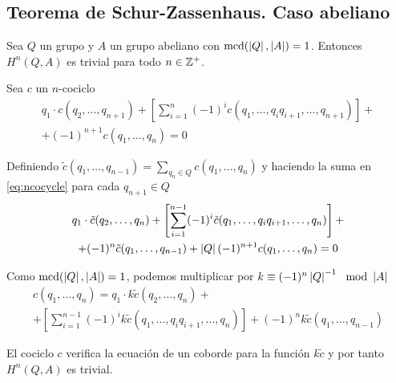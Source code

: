 \subsection{Teorema de Schur-Zassenhaus. Caso abeliano}

\begin{lema}\label{lem:trivh2}%
	Sea $Q$ un grupo y $A$ un grupo abeliano con $\operatorname{mcd}(\left|Q\right|, \left|A\right|) = 1$. Entonces $H^n(Q,A)$ es trivial para todo $n\in\mathbb{Z}^+$.
	\begin{demostracion}
		Sea $c$ un $n$-cociclo
		\begin{multline}\label{eq:ncocycle}
			q_1\cdot c(q_2,\hdots,q_{n+1}) + \left[\sum\limits_{i=1}^{n} (-1)^i c(q_1,\hdots,q_iq_{i+1},\hdots,q_{n+1}) \right] + \\ + (-1)^{n+1}c(q_1,\hdots,q_n) = 0
		\end{multline}
		
		Definiendo $\tilde c(q_1,\hdots,q_{n-1}) = {\displaystyle \sum_{q_n\in Q} c(q_1,\hdots,q_{n})}$ y haciendo la suma en \eqref{eq:ncocycle} para cada $q_{n+1} \in Q$
		\begin{multline*}
			q_1\cdot \tilde c(q_2,\hdots,q_n) + \left[\sum\limits_{i=1}^{n-1}(-1)^i \tilde c(q_1,\hdots,q_iq_{i+1},\hdots,q_{n}) \right] +\\+ (-1)^n\tilde c(q_1,\hdots,q_{n-1})+ \left|Q\right|(-1)^{n+1} c(q_1,\hdots,q_n) = 0
		\end{multline*}
		
		Como $\operatorname{mcd}(\left|Q\right|, \left|A\right|) = 1$, podemos multiplicar por $k \equiv (-1)^n\ord{Q}^{-1} \mod \ord{A}$
		\begin{multline*}
			c(q_1,\hdots,q_n) = q_1\cdot k\tilde c(q_2,\hdots,q_n) + \\ + \left[\sum\limits_{i=1}^{n-1}(-1)^i k\tilde c(q_1,\hdots,q_iq_{i+1},\hdots,q_{n}) \right] + (-1)^nk\tilde c(q_1,\hdots,q_{n-1}) 
		\end{multline*}
		
		El cociclo $c$ verifica la ecuación de un coborde para la función $k \tilde c$ y por tanto $H^n(Q,A)$ es trivial.
		
		
	\end{demostracion}
\end{lema}

